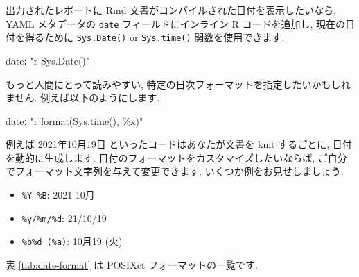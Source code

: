 \documentclass[
  11pt,
  lualatex,ja=standard,jafont=noto]{bxjsreport}
\newenvironment{Shaded}{\begin{snugshade}}{\end{snugshade}}
\newcommand{\AttributeTok}[1]{\textcolor[rgb]{0.77,0.63,0.00}{#1}}
\newcommand{\FunctionTok}[1]{\textcolor[rgb]{0.00,0.00,0.00}{#1}}
\newcommand{\KeywordTok}[1]{\textcolor[rgb]{0.13,0.29,0.53}{\textbf{#1}}}
\newcommand{\StringTok}[1]{\textcolor[rgb]{0.31,0.60,0.02}{#1}}
\providecommand{\tightlist}{%
  \setlength{\itemsep}{0pt}\setlength{\parskip}{0pt}}
\begin{document}
出力されたレポートに Rmd 文書がコンパイルされた日付を表示したいなら, YAML メタデータの \texttt{date} フィールドにインライン R コードを追加し, 現在の日付を得るために \texttt{Sys.Date()} or \texttt{Sys.time()} 関数を使用できます.

\begin{Shaded}
\begin{Highlighting}[]
\FunctionTok{date}\KeywordTok{:}\AttributeTok{ }\StringTok{"\textasciigrave{}r Sys.Date()\textasciigrave{}"}
\end{Highlighting}
\end{Shaded}

もっと人間にとって読みやすい, 特定の日次フォーマットを指定したいかもしれません. 例えば以下のようにします.

\begin{Shaded}
\begin{Highlighting}[]
\FunctionTok{date}\KeywordTok{:}\AttributeTok{ }\StringTok{"\textasciigrave{}r format(Sys.time(), \textquotesingle{}\%x\textquotesingle{})\textasciigrave{}"}
\end{Highlighting}
\end{Shaded}

例えば 2021年10月19日 といったコードはあなたが文書を knit するごとに, 日付を動的に生成します. 日付のフォーマットをカスタマイズしたいならば, ご自分でフォーマット文字列を与えて変更できます. いくつか例をお見せしましょう.

\begin{itemize}
\tightlist
\item
  \texttt{\%Y \%B}: 2021 10月
\item
  \texttt{\%y/\%m/\%d}: 21/10/19
\item
  \texttt{\%b\%d (\%a)}: 10月19 (火)
\end{itemize}

表 \ref{tab:date-format} は POSIXct フォーマットの一覧です.
\end{document}
